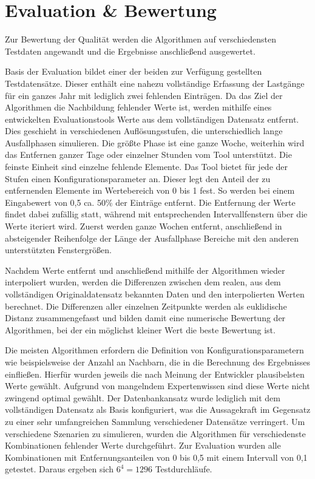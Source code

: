 
\section{Evaluation \& Bewertung}

Zur Bewertung der Qualität werden die Algorithmen auf verschiedensten Testdaten angewandt und die Ergebnisse anschließend ausgewertet.

Basis der Evaluation bildet einer der beiden zur Verfügung gestellten Testdatensätze. Dieser enthält eine nahezu vollständige Erfassung der Lastgänge für ein ganzes Jahr mit lediglich zwei fehlenden Einträgen. Da das Ziel der Algorithmen die Nachbildung fehlender Werte ist, werden mithilfe eines entwickelten Evaluationstools Werte aus dem vollständigen Datensatz entfernt. Dies geschieht in verschiedenen Auflösungsstufen, die unterschiedlich lange Ausfallphasen simulieren. Die größte Phase ist eine ganze Woche, weiterhin wird das Entfernen ganzer Tage oder einzelner Stunden vom Tool unterstützt. Die feinste Einheit sind einzelne fehlende Elemente. Das Tool bietet für jede der Stufen einen Konfigurationsparameter an. Dieser legt den Anteil der zu entfernenden Elemente im Wertebereich von 0 bis 1 fest. So werden bei einem Eingabewert von 0,5 ca. 50\% der Einträge entfernt. Die Entfernung der Werte findet dabei zufällig statt, während mit entsprechenden Intervallfenstern über die Werte iteriert wird. Zuerst werden ganze Wochen entfernt, anschließend in absteigender Reihenfolge der Länge der Ausfallphase Bereiche mit den anderen unterstützten Fenstergrößen.

Nachdem Werte entfernt und anschließend mithilfe der Algorithmen wieder interpoliert wurden, werden die Differenzen zwischen dem realen, aus dem vollständigen Originaldatensatz bekannten Daten und den interpolierten Werten berechnet. Die Differenzen aller einzelnen Zeitpunkte werden als euklidische Distanz zusammengefasst und bilden damit eine numerische Bewertung der Algorithmen, bei der ein möglichst kleiner Wert die beste Bewertung ist.

Die meisten Algorithmen erfordern die Definition von Konfigurationsparametern wie beispielsweise der Anzahl an Nachbarn, die in die Berechnung des Ergebnisses einfließen. Hierfür wurden jeweils die nach Meinung der Entwickler plausibelsten Werte gewählt. Aufgrund von mangelndem Expertenwissen sind diese Werte nicht zwingend optimal gewählt. Der Datenbankansatz wurde lediglich mit dem vollständigen Datensatz als Basis konfiguriert, was die Aussagekraft im Gegensatz zu einer sehr umfangreichen Sammlung verschiedener Datensätze verringert.
Um verschiedene Szenarien zu simulieren, wurden die Algorithmen für verschiedenste Kombinationen fehlender Werte durchgeführt. Zur Evaluation wurden alle Kombinationen mit Entfernungsanteilen von 0 bis 0,5 mit einem Intervall von 0,1 getestet. Daraus ergeben sich $ 6 ^ 4 = 1296 $ Testdurchläufe.

